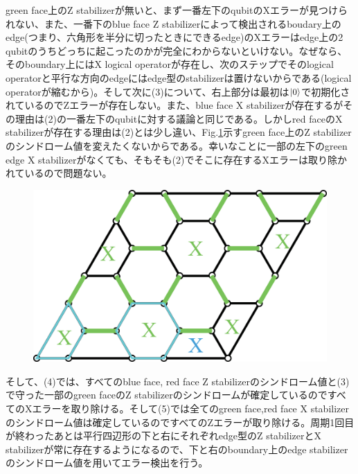 \documentclass[a4paper,10pt]{ltjsarticle}
\begin{document}
{    green face上のZ stabilizerが無いと、まず一番左下のqubitのXエラーが見つけられない、また、一番下のblue face Z stabilizerによって検出されるboudary上のedge(つまり、六角形を半分に切ったときにできるedge)のXエラーはedge上の2 qubitのうちどっちに起こったのかが完全にわからないといけない。なぜなら、そのboundary上にはX logical operatorが存在し、次のステップでそのlogical operatorと平行な方向のedgeにはedge型のstabilizerは置けないからである(logical operatorが縮むから)。そして次に(3)について、右上部分は最初は$\ket{0}$で初期化されているのでZエラーが存在しない。また、blue face X stabilizerが存在するがその理由は(2)の一番左下のqubitに対する議論と同じである。しかしred faceのX stabilizerが存在する理由は(2)とは少し違い、Fig.\ref{figure9}示すgreen face上のZ stabilizerのシンドローム値を変えたくないからである。幸いなことに一部の左下のgreen edge X stabilizerがなくても、そもそも(2)でそこに存在するXエラーは取り除かれているので問題ない。
    
    \begin{figure}[h]
        \centering
        \includegraphics[scale=0.2]{figure/figure9.eps}
        \caption{ }
        \label{figure9}
    \end{figure}

    そして、(4)では、すべてのblue face, red face Z stabilizerのシンドローム値と(3)で守った一部のgreen faceのZ stabilizerのシンドロームが確定しているのですべてのXエラーを取り除ける。そして(5)では全てのgreen face,red face X stabilizerのシンドローム値は確定しているのですべてのZエラーが取り除ける。周期1回目が終わったあとは平行四辺形の下と右にそれぞれedge型のZ stabilizerとX stabilizerが常に存在するようになるので、下と右のboundary上のedge stabilizerのシンドローム値を用いてエラー検出を行う。

    
}
\end{document}
